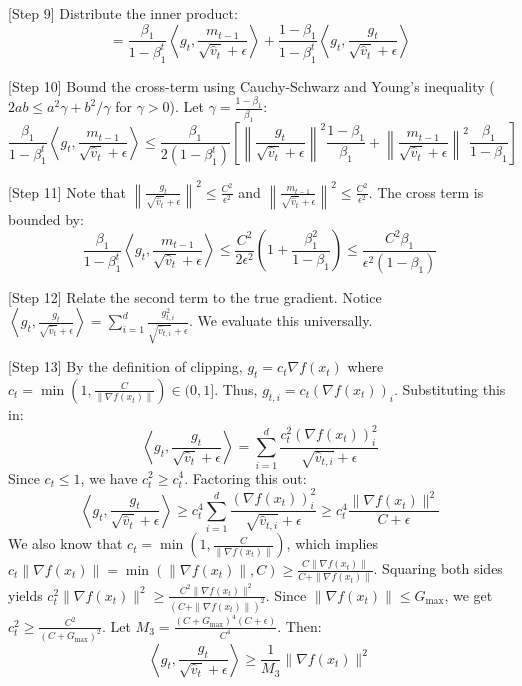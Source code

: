\documentclass{article}
\begin{document}
[Step 9] Distribute the inner product:
$$
= \frac{\beta_1}{1-\beta_1^t} \left\langle g_t, \frac{m_{t-1}}{\sqrt{\hat{v}_t} + \epsilon} \right\rangle + \frac{1-\beta_1}{1-\beta_1^t} \left\langle g_t, \frac{g_t}{\sqrt{\hat{v}_t} + \epsilon} \right\rangle
$$

[Step 10] Bound the cross-term using Cauchy-Schwarz and Young's inequality ($2ab \leq a^2 \gamma + b^2/\gamma$ for $\gamma > 0$). Let $\gamma = \frac{1-\beta_1}{\beta_1}$:
$$
\frac{\beta_1}{1-\beta_1^t} \left\langle g_t, \frac{m_{t-1}}{\sqrt{\hat{v}_t} + \epsilon} \right\rangle \leq \frac{\beta_1}{2(1-\beta_1^t)} \left[ \left\| \frac{g_t}{\sqrt{\hat{v}_t} + \epsilon} \right\|^2 \frac{1-\beta_1}{\beta_1} + \left\| \frac{m_{t-1}}{\sqrt{\hat{v}_t} + \epsilon} \right\|^2 \frac{\beta_1}{1-\beta_1} \right]
$$

[Step 11] Note that $\left\| \frac{g_t}{\sqrt{\hat{v}_t} + \epsilon} \right\|^2 \leq \frac{C^2}{\epsilon^2}$ and $\left\| \frac{m_{t-1}}{\sqrt{\hat{v}_t} + \epsilon} \right\|^2 \leq \frac{C^2}{\epsilon^2}$. The cross term is bounded by:
$$
\frac{\beta_1}{1-\beta_1^t} \left\langle g_t, \frac{m_{t-1}}{\sqrt{\hat{v}_t} + \epsilon} \right\rangle \leq \frac{C^2}{2\epsilon^2} \left( 1 + \frac{\beta_1^2}{1-\beta_1} \right) \leq \frac{C^2 \beta_1}{\epsilon^2 (1-\beta_1)}
$$

[Step 12] Relate the second term to the true gradient. Notice $\left\langle g_t, \frac{g_t}{\sqrt{\hat{v}_t} + \epsilon} \right\rangle = \sum_{i=1}^d \frac{g_{t,i}^2}{\sqrt{\hat{v}_{t,i}} + \epsilon}$. We evaluate this universally.

[Step 13] By the definition of clipping, $g_t = c_t \nabla f(x_t)$ where $c_t = \min\left(1, \frac{C}{\|\nabla f(x_t)\|}\right) \in (0, 1]$. Thus, $g_{t,i} = c_t (\nabla f(x_t))_i$. Substituting this in:
$$
\left\langle g_t, \frac{g_t}{\sqrt{\hat{v}_t} + \epsilon} \right\rangle = \sum_{i=1}^d \frac{c_t^2 (\nabla f(x_t))_i^2}{\sqrt{\hat{v}_{t,i}} + \epsilon}
$$
Since $c_t \leq 1$, we have $c_t^2 \geq c_t^4$. Factoring this out:
$$
\left\langle g_t, \frac{g_t}{\sqrt{\hat{v}_t} + \epsilon} \right\rangle \geq c_t^4 \sum_{i=1}^d \frac{(\nabla f(x_t))_i^2}{\sqrt{\hat{v}_{t,i}} + \epsilon} \geq c_t^4 \frac{\|\nabla f(x_t)\|^2}{C+\epsilon}
$$
We also know that $c_t = \min\left(1, \frac{C}{\|\nabla f(x_t)\|}\right)$, which implies $c_t \|\nabla f(x_t)\| = \min(\|\nabla f(x_t)\|, C) \geq \frac{C \|\nabla f(x_t)\|}{C + \|\nabla f(x_t)\|}$. Squaring both sides yields $c_t^2 \|\nabla f(x_t)\|^2 \geq \frac{C^2 \|\nabla f(x_t)\|^2}{(C + \|\nabla f(x_t)\|)^2}$. Since $\|\nabla f(x_t)\| \leq G_{\max}$, we get $c_t^2 \geq \frac{C^2}{(C + G_{\max})^2}$. Let $M_3 = \frac{(C+G_{\max})^4 (C+\epsilon)}{C^4}$. Then:
$$
\left\langle g_t, \frac{g_t}{\sqrt{\hat{v}_t} + \epsilon} \right\rangle \geq \frac{1}{M_3} \|\nabla f(x_t)\|^2
$$
\end{document}

